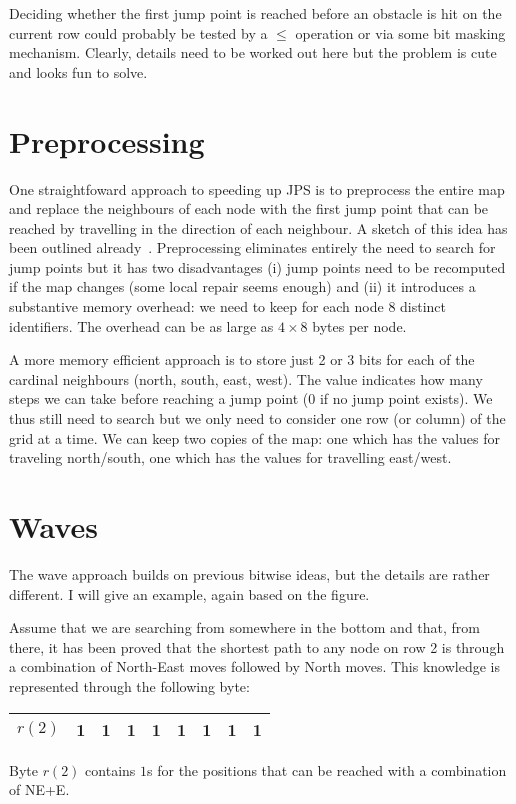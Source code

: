 \documentclass{article}
\begin{document}
Deciding whether the first jump point is  reached
before an obstacle is hit on the current row 
could probably be tested by a $\le$ operation or via
some bit masking mechanism.
Clearly, details need to be worked out here but the problem
is cute and looks fun to solve.

\section{Preprocessing}
One straightfoward approach to speeding up JPS is to preprocess
the entire map and replace the neighbours of each node
with the first jump point that can be reached by travelling in the
direction of each neighbour. A sketch of this idea has been 
outlined already~\cite{harabor12}.
Preprocessing eliminates entirely the need to search for jump
points but it has two disadvantages (i) jump points need to be recomputed
if the map changes (some local repair seems enough) and (ii) it introduces 
a substantive memory overhead: we need to keep for each node 8 distinct identifiers. 
The overhead can be as large as $4\times8$ bytes per node.

A more memory efficient approach is to store just 2 or 3 bits for each
of the cardinal neighbours (north, south, east, west).
The value indicates how many steps we can take before 
reaching a jump point (0 if no jump point exists). We thus still
need to search but we only need to consider one row (or column) of 
the grid at a time. We can keep two copies of the map: one
which has the values for traveling north/south, one which
has the values for travelling east/west. 

\section{Waves}
The wave approach builds on previous bitwise ideas, 
but the details are rather different.  
I will give an example, again based on the figure.  

Assume that we are searching from somewhere in the bottom 
and that, from there, it has been proved 
that the shortest path to any node on row 2 
is through a combination of North-East moves followed by North moves.  
This knowledge is represented through the following byte: 
\begin{center}
  \begin{tabular}{|l|c|c|c|c|c|c|c|c|}
    \hline
    $r(2)$ & 1 & 1 & 1 & 1 & 1 & 1 & 1 & 1 \\
    \hline
  \end{tabular}
\end{center}
Byte $r(2)$ contains $1$s for the positions 
that can be reached with a combination of NE+E.  
\end{document}
